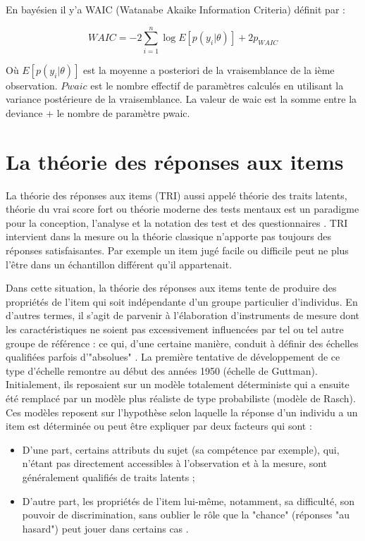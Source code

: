 En bayésien il y’a WAIC (Watanabe Akaike Information Criteria) définit par :

\begin{equation}
	WAIC = -2\sum_{i=1}^{n} \log E\left[ p(y_{i}|\theta) \right] + 2p_{WAIC}
	\label{waic_formula}
\end{equation}

Où \(\displaystyle E\left[ p(y_{i}|\theta) \right] \) est la moyenne a posteriori de la vraisemblance de la ième observation.
\(\displaystyle Pwaic \)  est le nombre effectif de paramètres calculés en utilisant la variance postérieure de la vraisemblance.
La valeur de waic est la somme entre la deviance + le nombre de paramètre pwaic.

\section{La théorie des réponses aux items}
La théorie des réponses aux items (TRI) aussi appelé théorie des traits latents, théorie du vrai score fort ou théorie moderne des tests mentaux est un paradigme pour la conception, l’analyse et la notation des test et des questionnaires \cite{fisher1922mathematical}. TRI intervient dans la mesure ou la théorie classique n’apporte pas toujours des réponses satisfaisantes. Par exemple un item jugé facile ou difficile peut ne plus l’être dans un échantillon différent qu’il appartenait.

Dans cette situation, la théorie des réponses aux items tente de produire des propriétés de l’item qui soit indépendante d’un groupe particulier d’individus. En d'autres termes, il s'agit de parvenir à l'élaboration d'instruments de mesure dont les caractéristiques ne soient pas excessivement influencées par tel ou tel autre groupe de référence : ce qui, d'une certaine manière, conduit à définir des échelles qualifiées parfois d'"absolues" \cite{xcv_wiki}. La première tentative de développement de ce type d’échelle remontre au début des années 1950 (échelle de Guttman). Initialement, ils reposaient sur un modèle totalement déterministe qui a ensuite été remplacé par un modèle plus réaliste de type probabiliste (modèle de Rasch). Ces modèles reposent sur l’hypothèse selon laquelle la réponse d’un individu a un item est déterminée ou peut être expliquer par deux facteurs qui sont :

\begin{itemize}
	\item D’une part, certains attributs du sujet (sa compétence par exemple), qui, n'étant pas directement accessibles à l'observation et à la mesure, sont généralement qualifiés de traits latents \cite{xcv_wiki} ;
	\item D’autre part, les propriétés de l'item lui-même, notamment, sa difficulté, son pouvoir de discrimination, sans oublier le rôle que la "chance" (réponses "au hasard") peut jouer dans certains cas \cite{xcv_wiki}.
\end{itemize}

